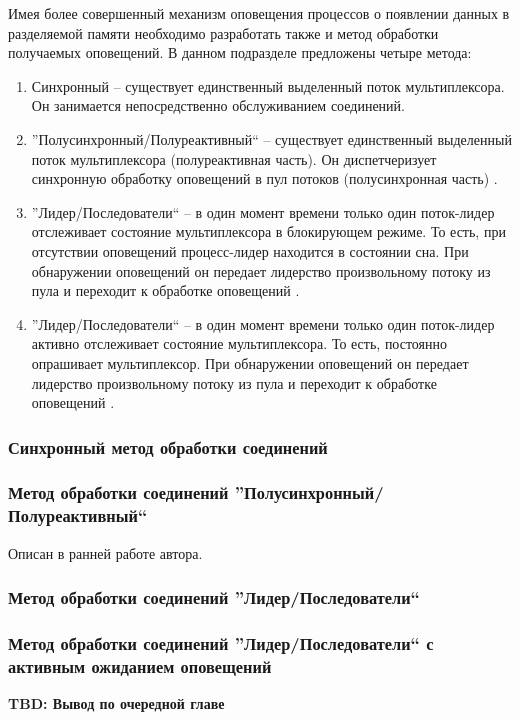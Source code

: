 Имея более совершенный механизм оповещения процессов о появлении данных в разделяемой памяти необходимо разработать также и метод обработки получаемых оповещений. В данном подразделе предложены четыре метода:
\begin{enumerate}
\item Синхронный -- существует единственный выделенный поток мультиплексора. Он занимается непосредственно обслуживанием соединений.
\item ''Полусинхронный/Полуреактивный`` -- существует единственный выделенный поток мультиплексора (полуреактивная часть). Он диспетчеризует синхронную обработку оповещений в пул потоков (полусинхронная часть) \cite{schmidt1995half}.
\item ''Лидер/Последователи`` -- в один момент времени только один поток-лидер отслеживает состояние мультиплексора в блокирующем режиме. То есть, при отсутствии оповещений процесс-лидер находится в состоянии сна. При обнаружении оповещений он передает лидерство произвольному потоку из пула и переходит к обработке оповещений \cite{schmidt1998leader}.
\item ''Лидер/Последователи`` -- в один момент времени только один поток-лидер активно отслеживает состояние мультиплексора. То есть, постоянно опрашивает мультиплексор. При обнаружении оповещений он передает лидерство произвольному потоку из пула и переходит к обработке оповещений \cite{schmidt1998leader}.
\end{enumerate}

\subsubsection{Синхронный метод обработки соединений}

\subsubsection{Метод обработки соединений ''Полусинхронный/Полуреактивный``}\label{chapter31:BlockingHSHA}
Описан в ранней работе \cite{GubarevFutex} автора.

\subsubsection{Метод обработки соединений ''Лидер/Последователи``}\label{chapter31:BlockingLF}

\subsubsection{Метод обработки соединений ''Лидер/Последователи`` с активным ожиданием оповещений}\label{chapter31:NonBlockingLF}

\chapterconclusion

\textbf{TBD: Вывод по очередной главе}
